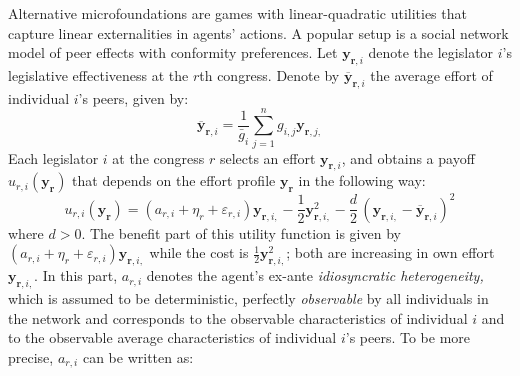 \documentclass[nojss]{jss}
\begin{document}
Alternative microfoundations are games with linear-quadratic utilities that
capture linear externalities in agents' actions. A popular setup is a social
network model of peer effects with conformity preferences. Let $\mathbf{y}_{\mathbf{r}, i}$ denote the legislator $i$'s legislative effectiveness at the $r$th congress. Denote by $\overline{\mathbf{y}}_{\mathbf{r}, i}$ the average effort of individual $i$'s
peers, given by:%
\begin{equation}
\overline{\mathbf{y}}_{\mathbf{r}, i}=\frac{1}{\bar g_{i}}\sum_{j=1}^{n}g_{i, j}\mathbf{y}_{\mathbf{r}, j,}
\label{aver}
\end{equation}%
Each legislator $i$ at the congress $r$ selects an effort $\mathbf{y}_{\mathbf{r}, i}$, and obtains
a payoff $u_{r, i}(\mathbf{y}_{\mathbf{r}})$ that depends on the effort profile $\mathbf{y}_{\mathbf{r}}$ in the following way:%
\begin{equation}
u_{r, i}(\mathbf{y}_{\mathbf{r}})=\left( a_{r, i}+\eta _{r}+\varepsilon _{r, i}\right) \mathbf{y}_{\mathbf{r}, i,}-%
\frac{1}{2}\mathbf{y}_{\mathbf{r}, i,}^{2}-\frac{d}{2}\,(\mathbf{y}_{\mathbf{r}, i,}-\overline{\mathbf{y}}_{\mathbf{r}, i})^{2}
\label{utility}
\end{equation}%
where $d>0$. The benefit part of this utility function is given by $\left( a_{r, i}+\eta _{r}+\varepsilon _{r, i}\right)\mathbf{y}_{\mathbf{r}, i,}$ while the cost is $%
\frac{1}{2}\mathbf{y}_{\mathbf{r}, i,}^{2}$; both are increasing in own effort $\mathbf{y}_{\mathbf{r}, i,}$. In
this part, $a_{r, i}$ denotes the agent's ex-ante \textsl{idiosyncratic
heterogeneity,} which is assumed to be deterministic, perfectly \textsl{%
observable} by all individuals in the network and corresponds to the
observable characteristics of individual $i$  and to the observable average
characteristics of individual $i$'s peers. To be more precise, $a_{r,i}$ can
be written as:
\end{document}
